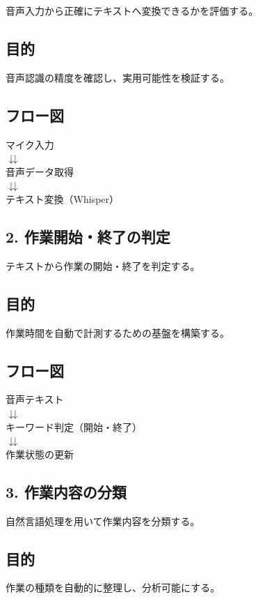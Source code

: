\documentclass[a4paper,12pt,ja=standard,lualatex]{bxjsarticle}
\begin{document}
音声入力から正確にテキストへ変換できるかを評価する。

\subsection*{目的}
音声認識の精度を確認し、実用可能性を検証する。

\subsection*{フロー図}
\begin{center}
マイク入力 \\
\(\downdownarrows\) \\
音声データ取得 \\
\(\downdownarrows\) \\
テキスト変換（Whisper）
\end{center}

\subsection*{2. 作業開始・終了の判定}

テキストから作業の開始・終了を判定する。

\subsection*{目的}
作業時間を自動で計測するための基盤を構築する。

\subsection*{フロー図}
\begin{center}
音声テキスト \\
\(\downdownarrows\) \\
キーワード判定（開始・終了） \\
\(\downdownarrows\) \\
作業状態の更新
\end{center}

\subsection*{3. 作業内容の分類}

自然言語処理を用いて作業内容を分類する。

\subsection*{目的}
作業の種類を自動的に整理し、分析可能にする。
\end{document}
